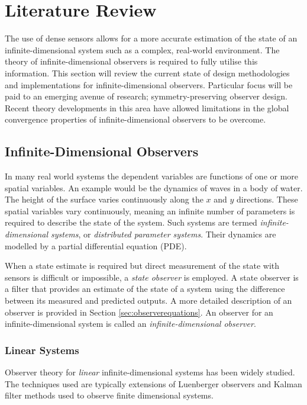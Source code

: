 \section{Literature Review} \label{sec:literature}
The use of dense sensors allows for a more accurate estimation of the state of an infinite-dimensional system such as a complex, real-world environment. The theory of infinite-dimensional observers is required to fully utilise this information. This section will review the current state of design methodologies and implementations for infinite-dimensional observers. Particular focus will be paid to an emerging avenue of research; symmetry-preserving observer design. Recent theory developments in this area have allowed limitations in the global convergence properties of infinite-dimensional observers to be overcome.

\subsection{Infinite-Dimensional Observers}
In many real world systems the dependent variables are functions of one or more spatial variables. An example would be the dynamics of waves in a body of water. The height of the surface varies continuously along the $x$ and $y$ directions. These spatial variables vary continuously, meaning an infinite number of parameters is required to describe the state of the system. Such systems are termed \textit{infinite-dimensional systems}, or \textit{distributed parameter systems}. Their dynamics are modelled by a partial differential equation (PDE). 

When a state estimate is required but direct measurement of the state with sensors is difficult or impossible, a \textit{state observer} is employed. A state observer is a filter that provides an estimate of the state of a system using the difference between its measured and predicted outputs. A more detailed description of an observer is provided in Section \ref{sec:observerequations}. An observer for an infinite-dimensional system is called an \textit{infinite-dimensional observer}.

\subsubsection{Linear Systems}
Observer theory for \textit{linear} infinite-dimensional systems has been widely studied. The techniques used are typically extensions of Luenberger observers and Kalman filter methods used to observe finite dimensional systems.

